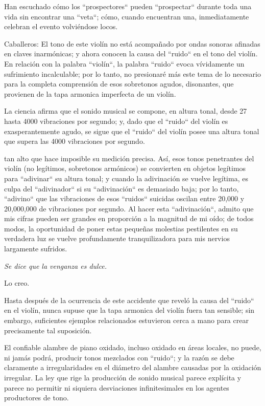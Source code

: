 \documentclass[12pt]{book}
\begin{document}
Han escuchado cómo los ``prospectores`` pueden ``prospectar`` durante toda una vida sin encontrar una ``veta``; cómo, cuando encuentran una, inmediatamente celebran el evento volviéndose locos.

Caballeros: El tono de este violín no está acompañado por ondas sonoras afinadas en claves inarmónicas; y ahora conocen la causa del ``ruido`` en el tono del violín. En relación con la palabra ``violín``, la palabra ``ruido`` evoca vívidamente un sufrimiento incalculable; por lo tanto, no presionaré más este tema de lo necesario para la completa comprensión de esos sobretonos agudos, disonantes, que provienen de la tapa armonica imperfecta de un violín.

La ciencia afirma que el sonido musical se compone, en altura tonal, desde 27 hasta 4000 vibraciones por segundo; y, dado que el ``ruido`` del violín es exasperantemente agudo, se sigue que el ``ruido`` del violín posee una altura tonal que supera las 4000 vibraciones por segundo.

tan alto que hace imposible su medición precisa. Así, esos tonos penetrantes del violín (no legítimos, sobretonos armónicos) se convierten en objetos legítimos para ``adivinar`` su altura tonal; y cuando la adivinación se vuelve legítima, es culpa del ``adivinador`` si su ``adivinación`` es demasiado baja; por lo tanto, ``adivino`` que las vibraciones de esos ``ruidos`` suicidas oscilan entre 20,000 y 20,000,000 de vibraciones por segundo. Al hacer esta ``adivinación``, admito que mis cifras pueden ser grandes en proporción a la magnitud de mi oído; de todos modos, la oportunidad de poner estas pequeñas molestias pestilentes en su verdadera luz se vuelve profundamente tranquilizadora para mis nervios largamente sufridos.

\textit{Se dice que la venganza es dulce.}

Lo creo.

Hasta después de la ocurrencia de este accidente que reveló la causa del ``ruido`` en el violín, nunca supuse que la tapa armonica del violín fuera tan sensible; sin embargo, suficientes ejemplos relacionados estuvieron cerca a mano para crear precisamente tal suposición.

El confiable alambre de piano oxidado, incluso oxidado en áreas locales, no puede, ni jamás podrá, producir tonos mezclados con ``ruido``; y la razón se debe claramente a irregularidades en el diámetro del alambre causadas por la oxidación irregular. La ley que rige la producción de sonido musical parece explícita y parece no permitir ni siquiera desviaciones infinitesimales en los agentes productores de tono.
\end{document}
